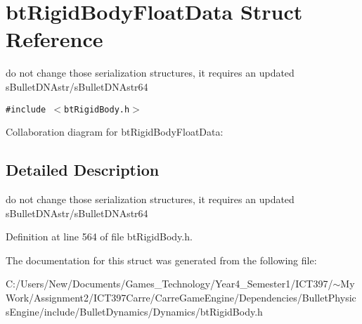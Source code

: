 \hypertarget{structbt_rigid_body_float_data}{
\section{btRigidBodyFloatData Struct Reference}
\label{structbt_rigid_body_float_data}
}
do not change those serialization structures, it requires an updated sBulletDNAstr/sBulletDNAstr64  


{\tt \#include $<$btRigidBody.h$>$}

Collaboration diagram for btRigidBodyFloatData:

\subsection{Detailed Description}
do not change those serialization structures, it requires an updated sBulletDNAstr/sBulletDNAstr64 

Definition at line 564 of file btRigidBody.h.

The documentation for this struct was generated from the following file:\begin{CompactItemize}
\item 
C:/Users/New/Documents/Games\_\-Technology/Year4\_\-Semester1/ICT397/$\sim$My Work/Assignment2/ICT397Carre/CarreGameEngine/Dependencies/BulletPhysicsEngine/include/BulletDynamics/Dynamics/btRigidBody.h\end{CompactItemize}
